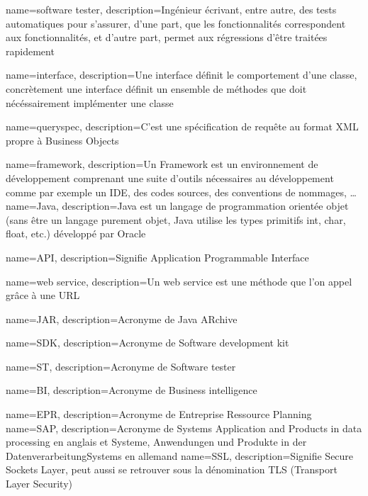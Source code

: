 {
	name={software tester},
	description={Ingénieur écrivant, entre autre, des tests automatiques pour s'assurer, d'une part, que les fonctionnalités correspondent aux fonctionnalités, et d'autre part, permet aux régressions d'être traitées rapidement}
}

{
	name={interface},
	description={Une interface définit le comportement d'une classe, concrètement une interface définit un ensemble de méthodes que doit nécéssairement implémenter une classe}
}

{
	name={queryspec},
	description={C'est une spécification de requête au format XML propre à Business Objects}
}

{
	name={framework},
	description={Un Framework est un environnement de développement comprenant une suite d'outils nécessaires au développement comme par exemple un IDE, des codes sources, des conventions de nommages, \ldots}
}
{
	name={Java},
	description={Java est un langage de programmation orientée objet (sans être un langage purement objet, Java utilise les types primitifs int, char, float, etc.) développé par Oracle}
}

{
	name={API},
	description={Signifie Application Programmable Interface}
}

{
	name={web service},
	description={Un web service est une méthode que l'on appel grâce à une URL}
}


{
	name={JAR},
	description={Acronyme de Java ARchive}
}

{
	name={SDK},
	description={Acronyme de Software development kit}
}

{
	name={ST},
	description={Acronyme de Software tester}
}

{
	name={BI},
	description={Acronyme de Business intelligence}
}

{
	name={EPR},
	description={Acronyme de Entreprise Ressource Planning}
}
{
	name={SAP},
	description={Acronyme de Systems Application and Products in data processing en anglais et Systeme, Anwendungen und Produkte in der DatenverarbeitungSystems en allemand}
}
{
	name={SSL},
	description={Signifie Secure Sockets Layer, peut aussi se retrouver sous la dénomination TLS (Transport Layer Security)}
}



